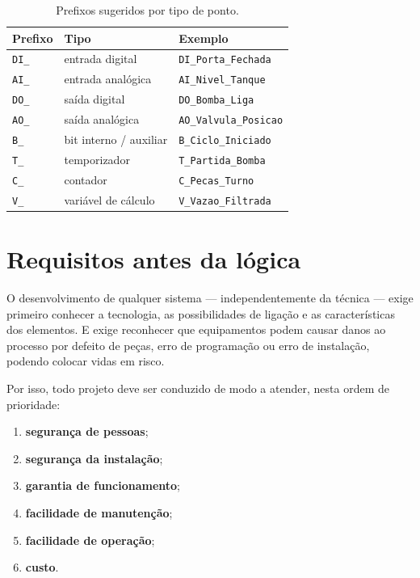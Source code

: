 \begin{table}[H]
  \centering
  \caption{Prefixos sugeridos por tipo de ponto.}
  \label{tab:prefixos}
  \begin{tabular}{l l l}
    \toprule
    Prefixo & Tipo & Exemplo \\
    \midrule
    \texttt{DI\_} & entrada digital & \texttt{DI\_Porta\_Fechada} \\
    \texttt{AI\_} & entrada analógica & \texttt{AI\_Nivel\_Tanque} \\
    \texttt{DO\_} & saída digital & \texttt{DO\_Bomba\_Liga} \\
    \texttt{AO\_} & saída analógica & \texttt{AO\_Valvula\_Posicao} \\
    \texttt{B\_}  & bit interno / auxiliar & \texttt{B\_Ciclo\_Iniciado} \\
    \texttt{T\_}  & temporizador & \texttt{T\_Partida\_Bomba} \\
    \texttt{C\_}  & contador & \texttt{C\_Pecas\_Turno} \\
    \texttt{V\_}  & variável de cálculo & \texttt{V\_Vazao\_Filtrada} \\
    \bottomrule
  \end{tabular}
\end{table}

\section{Requisitos antes da lógica}

O desenvolvimento de qualquer sistema --- independentemente da técnica --- exige primeiro conhecer a
tecnologia, as possibilidades de ligação e as características dos elementos. E exige reconhecer que
equipamentos podem causar danos ao processo por defeito de peças, erro de programação ou erro de
instalação, podendo colocar vidas em risco.

Por isso, todo projeto deve ser conduzido de modo a atender, nesta ordem de prioridade:

\begin{enumerate}
  \item \textbf{segurança de pessoas};
  \item \textbf{segurança da instalação};
  \item \textbf{garantia de funcionamento};
  \item \textbf{facilidade de manutenção};
  \item \textbf{facilidade de operação};
  \item \textbf{custo}.
\end{enumerate}


